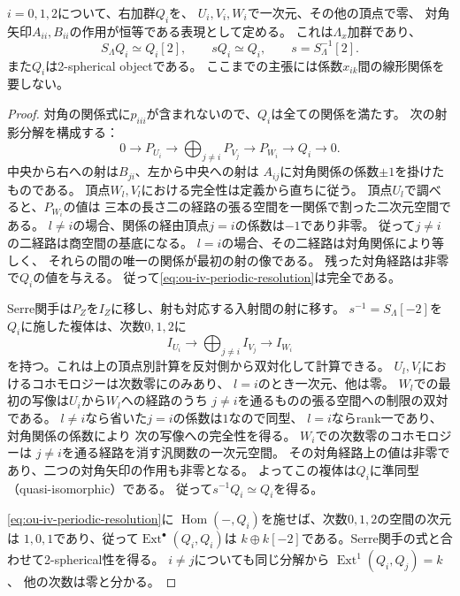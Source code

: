 \begin{lemma}[三つの反標準周期対象]
\label{lem:ou-iv-periodic-three}
$i=0,1,2$について、右加群$Q_i$を、
$U_i,V_i,W_i$で一次元、その他の頂点で零、
対角矢印$A_{ii},B_{ii}$の作用が恒等である表現として定める。
これは$\Lambda_x$加群であり、
\[
 S_\Lambda Q_i\simeq Q_i[2],\qquad
 sQ_i\simeq Q_i,\qquad s=S_\Lambda^{-1}[2].
\]
また$Q_i$は2-spherical objectである。
ここまでの主張には係数$x_{ik}$間の線形関係を要しない。
\end{lemma}
\begin{proof}
対角の関係式に$p_{iii}$が含まれないので、$Q_i$は全ての関係を満たす。
次の射影分解を構成する：
\begin{equation}\label{eq:ou-iv-periodic-resolution}
 0\longrightarrow P_{U_i}
 \longrightarrow \bigoplus_{j\ne i}P_{V_j}
 \longrightarrow P_{W_i}\longrightarrow Q_i\longrightarrow0.
\end{equation}
中央から右への射は$B_{ji}$、左から中央への射は
$A_{ij}$に対角関係の係数$\pm1$を掛けたものである。
頂点$W_l,V_l$における完全性は定義から直ちに従う。
頂点$U_l$で調べると、$P_{W_i}$の値は
三本の長さ二の経路の張る空間を一関係で割った二次元空間である。
$l\ne i$の場合、関係の経由頂点$j=i$の係数は$-1$であり非零。
従って$j\ne i$の二経路は商空間の基底になる。
$l=i$の場合、その二経路は対角関係により等しく、
それらの間の唯一の関係が最初の射の像である。
残った対角経路は非零で$Q_i$の値を与える。
従って\eqref{eq:ou-iv-periodic-resolution}は完全である。

Serre関手は$P_Z$を$I_Z$に移し、射も対応する入射間の射に移す。
$s^{-1}=S_\Lambda[-2]$を$Q_i$に施した複体は、次数$0,1,2$に
\[
 I_{U_i}\longrightarrow \bigoplus_{j\ne i} I_{V_j}
 \longrightarrow I_{W_i}
\]
を持つ。これは上の頂点別計算を反対側から双対化して計算できる。
$U_l,V_l$におけるコホモロジーは次数零にのみあり、
$l=i$のとき一次元、他は零。
$W_l$での最初の写像は$U_i$から$W_l$への経路のうち
$j\ne i$を通るものの張る空間への制限の双対である。
$l\ne i$なら省いた$j=i$の係数は$1$なので同型、
$l=i$ならrank一であり、対角関係の係数により
次の写像への完全性を得る。
$W_i$での次数零のコホモロジーは
$j\ne i$を通る経路を消す汎関数の一次元空間。
その対角経路上の値は非零であり、二つの対角矢印の作用も非零となる。
よってこの複体は$Q_i$に準同型（quasi-isomorphic）である。
従って$s^{-1}Q_i\simeq Q_i$を得る。

\eqref{eq:ou-iv-periodic-resolution}に
$\operatorname{Hom}(-,Q_i)$を施せば、次数$0,1,2$の空間の次元は
$1,0,1$であり、従って$\operatorname{Ext}^\bullet(Q_i,Q_i)$は
$k\oplus k[-2]$である。Serre関手の式と合わせて2-spherical性を得る。
$i\ne j$についても同じ分解から
$\operatorname{Ext}^1(Q_i,Q_j)=k$、
他の次数は零と分かる。
\end{proof}

